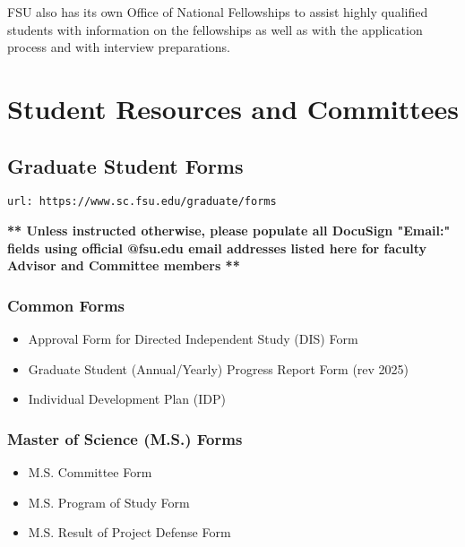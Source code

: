 \documentclass[12pt,a4paper]{article}
\begin{document}
FSU also has its own Office of National Fellowships to assist highly qualified students with information on the fellowships as well as with the application process and with interview preparations.

\section{Student Resources and Committees}

\subsection{Graduate Student Forms}
\texttt{url: https://www.sc.fsu.edu/graduate/forms}

\textbf{** Unless instructed otherwise, please populate all DocuSign "Email:" fields using official @fsu.edu email addresses listed here for faculty Advisor and Committee members **}

\subsubsection*{Common Forms}
\begin{itemize}
    \item Approval Form for Directed Independent Study (DIS) Form
    \item Graduate Student (Annual/Yearly) Progress Report Form (rev 2025)
    \item Individual Development Plan (IDP)
\end{itemize}

\subsubsection*{Master of Science (M.S.) Forms}
\begin{itemize}
    \item M.S. Committee Form
    \item M.S. Program of Study Form
    \item M.S. Result of Project Defense Form
\end{itemize}
\end{document}
